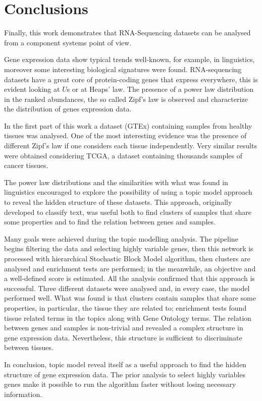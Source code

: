 \chapter{Conclusions}\label{ch:conclusions}
Finally, this work demonstrates that RNA-Sequencing datasets can be analysed from a component systems point of view.

Gene expression data show typical trends well-known, for example, in linguistics, moreover some interesting biological signatures were found. RNA-sequencing datasets have a great core of protein-coding genes that express everywhere, this is evident looking at $U$s or at Heaps' law. The presence of a power law distribution in the ranked abundances, the so called Zipf's law is observed and characterize the distribution of genes expression data.

In the first part of this work a dataset (GTEx) containing samples from healthy tissues was analysed. One of the most interesting evidence was the presence of different Zipf's law if one considers each tissue independently. Very similar results were obtained considering TCGA, a dataset containing thousands samples of cancer tissues.

The power law distributions and the similarities with what was found in linguistics encouraged to explore the possibility of using a topic model approach to reveal the hidden structure of these datasets. This approach, originally developed to classify text, was useful both to find clusters of samples that share some properties and to find the relation between genes and samples.

Many goals were achieved during the topic modelling analysis. The pipeline begins filtering the data and selecting highly variable genes, then this network is processed with hierarchical Stochastic Block Model algorithm, then clusters are analysed and enrichment tests are performed; in the meanwhile, an objective and a well-defined score is estimated. All the analysis confirmed that this approach is successful. Three different datasets were analysed and, in every case, the model performed well. What was found is that clusters contain samples that share some properties, in particular, the tissue they are related to; enrichment tests found tissue related terms in the topics along with Gene Ontology terms. The relation between genes and samples is non-trivial and revealed a complex structure in gene expression data. Nevertheless, this structure is sufficient to discriminate between tissues.

In conclusion, topic model reveal itself as a useful approach to find the hidden structure of gene expression data. The prior analysis to select highly variables genes make it possible to run the algorithm faster without losing necessary information.

